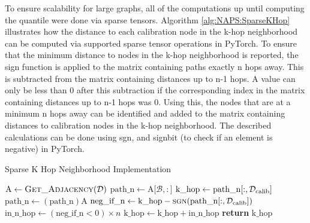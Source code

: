 To ensure scalability for large graphs, all of the computations up until computing the quantile were done via sparse tensors. Algorithm \ref{alg:NAPS:SparseKHop} illustrates how the distance to each calibration node in the k-hop neighborhood can be computed via supported sparse tensor operations in PyTorch. To ensure that the minimum distance to nodes in the k-hop neighborhood is reported, the sign function is applied to the matrix containing paths exactly n hops away. This is subtracted from the matrix containing distances up to n-1 hops. A value can only be less than 0 after this subtraction if the corresponding index in the matrix containing distances up to n-1 hops was 0. Using this, the nodes that are at a minimum n hops away can be identified and added to the matrix containing distances to calibration nodes in the k-hop neighborhood. The described calculations can be done using sgn, and signbit (to check if an element is negative) in PyTorch.  

\begin{algorithm}
\caption{Sparse K Hop Neighborhood Implementation}\label{alg:NAPS:SparseKHop}
\begin{algorithmic}[1]
    \State $\text{A}\gets \Call{\text{Get\_Adjacency}}{\mathcal{D}}$ 
    \State $\text{path\_n}\gets \text{A[$\mathcal{B},:$]}$
    \State $\text{k\_hop}\gets \text{path\_n[$:,\mathcal{D_{\mathrm{calib}}}$]}$
        \State $\text{path\_n} \gets (\text{path\_n})\text{A}$
        \State $\text{neg\_if\_n}\gets \text{k\_hop}-\Call{\text{sgn}}{\text{path\_n[$:,\calib$]}}$
        \State $\text{in\_n\_hop}\gets (\text{neg\_if\_n}<0)\times n$ 
        \State $\text{k\_hop} \gets \text{k\_hop} + \text{in\_n\_hop}$
    \EndFor\label{khopendwhile}
    \State \textbf{return} $\text{k\_hop}$
\EndProcedure
\end{algorithmic}
\end{algorithm}